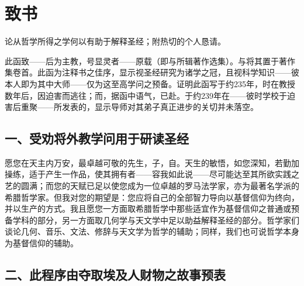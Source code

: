
\chapter{致书}


论从哲学所得之学何以有助于解释圣经；附热切的个人恳请。\par

此函致——后为主教，号显灵者——原载（即与所辑著作选集）。与将其置于著作集卷首。此函为注释书之佳序，显示视圣经研究为诸学之冠，且视科学知识——彼本人即为其中大师——仅为这至高学问之预备。证明此函写于约235年，时在教授数年后，因迫害而逃往；而，据函中语气，已赴。于约239年在——彼时学校于迫害后重聚——所发表的，显示导师对其弟子真正进步的关切并未落空。\par


\section{一、受劝将外教学问用于研读圣经}

愿您在天主内万安，最卓越可敬的先生，子，自。天生的敏悟，如您深知，若勤加操练，适于产生一作品，使其拥有者——容我如此说——尽可能达至其所欲实践之艺的圆满；而您的天赋已足以使您成为一位卓越的罗马法学家，亦为最著名学派的希腊哲学家。但我对您的期望是：您应将自己的全部智力导向以基督信仰为终向，并以生产的方式。我且愿您一方面取希腊哲学中那些适宜作为基督信仰之普通或预备学科的部分，另一方面取几何学与天文学中足以助益解释圣经的部分。哲学家们谈论几何、音乐、文法、修辞与天文学为哲学的辅助；同样，我们也可说哲学本身为基督信仰的辅助。\par


\section{二、此程序由夺取埃及人财物之故事预表}


